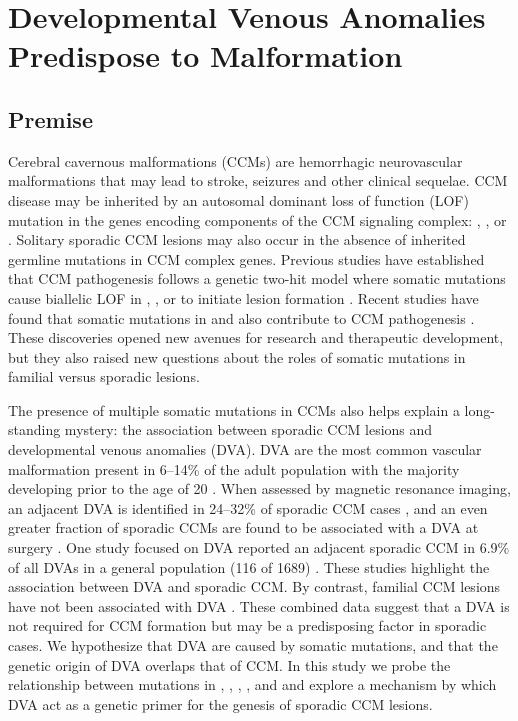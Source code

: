\chapter{Developmental Venous Anomalies Predispose to Malformation}
\label{chap:hht}

\clearpage

\section{Premise}
Cerebral cavernous malformations (CCMs) are hemorrhagic neurovascular malformations that may lead to stroke, seizures and other clinical sequelae. CCM disease may be inherited by an autosomal dominant loss of function (LOF) mutation in the genes encoding components of the CCM signaling complex:  \citep{couteulx1999, sahoo1999},  \citep{liquori2003}, or  \citep{bergametti2005}. Solitary sporadic CCM lesions may also occur in the absence of inherited germline mutations in CCM complex genes. Previous studies have established that CCM pathogenesis follows a genetic two-hit model where somatic mutations cause biallelic LOF in , , or  to initiate lesion formation \citep{akers2009, gault2009, gault2005, mcdonald2014}. Recent studies have found that somatic mutations in  and  also contribute to CCM pathogenesis \citep{hong2021, ren2021, weng2021}. These discoveries opened new avenues for research and therapeutic development, but they also raised new questions about the roles of somatic mutations in familial versus sporadic lesions. 
	
The presence of multiple somatic mutations in CCMs also helps explain a long-standing mystery: the association between sporadic CCM lesions and developmental venous anomalies (DVA). DVA are the most common vascular malformation present in 6--14\% of the adult population \citep{brinjikji2017, gokce2014, jones2015, linscott2016} with the majority developing prior to the age of 20 \citep{brinjikji2017}.  When assessed by magnetic resonance imaging, an adjacent DVA is identified in 24--32\% of sporadic CCM cases \citep{abdulrauf1999, porter1997, wurm2005}, and an even greater fraction of sporadic CCMs are found to be associated with a DVA at surgery \citep{abdulrauf1999, porter1997}. One study focused on DVA reported an adjacent sporadic CCM in 6.9\% of all DVAs in a general population (116 of 1689) \citep{brinjikji2017}. These studies highlight the association between DVA and sporadic CCM. By contrast, familial CCM lesions have not been associated with DVA \citep{dammann2017}. These combined data suggest that a DVA is not required for CCM formation but may be a predisposing factor in sporadic cases. We hypothesize that DVA are caused by somatic mutations, and that the genetic origin of DVA overlaps that of CCM. In this study we probe the relationship between mutations in , , , , and  and explore a mechanism by which DVA act as a genetic primer for the genesis of sporadic CCM lesions. 


